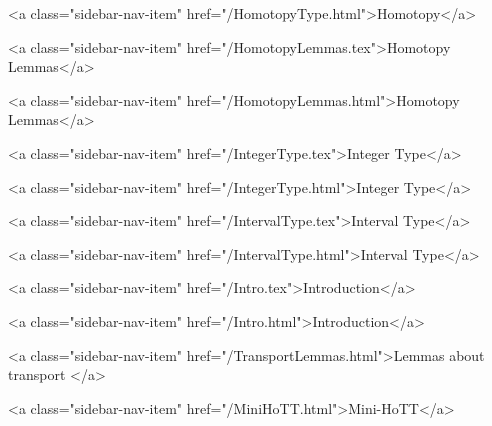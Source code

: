       
    
      
        
          <a class="sidebar-nav-item" href="/HomotopyType.html">Homotopy</a>
        
      
    
      
        
          <a class="sidebar-nav-item" href="/HomotopyLemmas.tex">Homotopy Lemmas</a>
        
      
    
      
        
          <a class="sidebar-nav-item" href="/HomotopyLemmas.html">Homotopy Lemmas</a>
        
      
    
      
        
          <a class="sidebar-nav-item" href="/IntegerType.tex">Integer Type</a>
        
      
    
      
        
          <a class="sidebar-nav-item" href="/IntegerType.html">Integer Type</a>
        
      
    
      
        
          <a class="sidebar-nav-item" href="/IntervalType.tex">Interval Type</a>
        
      
    
      
        
          <a class="sidebar-nav-item" href="/IntervalType.html">Interval Type</a>
        
      
    
      
        
          <a class="sidebar-nav-item" href="/Intro.tex">Introduction</a>
        
      
    
      
        
          <a class="sidebar-nav-item" href="/Intro.html">Introduction</a>
        
      
    
      
        
          <a class="sidebar-nav-item" href="/TransportLemmas.html">Lemmas about transport </a>
        
      
    
      
        
          <a class="sidebar-nav-item" href="/MiniHoTT.html">Mini-HoTT</a>
        
